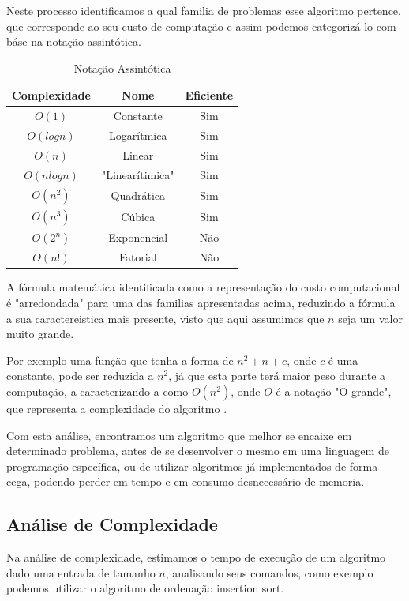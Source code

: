 \documentclass[
	12pt,				%
	openright,			%
	oneside,			%
	a4paper,			%
	english,			%
	brazil				%
	]{abntex2}
\begin{document}
Neste processo identificamos a qual familia de problemas esse algoritmo pertence, que corresponde ao seu custo de
computação \cite{introductionAlgorthms} e assim podemos categorizá-lo com báse na notação assintótica.

\begin{table}[H]
	\centering
	\caption{\label{Notação Assintótica}Notação Assintótica}
	\begin{tabular}{|c|c|c|}
	\hline
		Complexidade & Nome & Eficiente \\ \hline
		$O(1)$ & Constante & Sim \\ \hline
		$O(log n)$ & Logarítmica & Sim \\ \hline
		$O(n)$ & Linear & Sim \\ \hline
		$O(n log n)$ & "Linearítimica" & Sim \\ \hline
		$O(n^2)$ & Quadrática & Sim \\ \hline
		$O(n^3)$ & Cúbica & Sim \\ \hline
		$O(2^n)$ & Exponencial & Não \\ \hline
		$O(n!)$ & Fatorial & Não \\ \hline
	\end{tabular}
\end{table}

A fórmula matemática identificada como a representação do custo computacional é "arredondada" para uma das familias
apresentadas acima, reduzindo a fórmula a sua caractereistica mais presente, visto que aqui assumimos que $n$ seja
um valor muito grande. 

Por exemplo uma função que tenha a forma de $n^2 + n + c$, onde $c$ é uma constante, pode ser reduzida a $n^2$, 
já que esta parte terá maior peso durante a computação, a caracterizando-a como $O(n^2)$, onde $O$ é a notação 
"O grande", que representa a complexidade do algoritmo \cite{introductionAlgorthms}.

Com esta análise, encontramos um algoritmo que melhor se encaixe em determinado problema, antes de se
desenvolver o mesmo em uma linguagem de programação específica, ou de utilizar algoritmos já implementados de forma
cega, podendo perder em tempo e em consumo desnecessário de memoria.

\subsection{Análise de Complexidade}

Na análise de complexidade, estimamos o tempo de execução de um algoritmo dado uma entrada de tamanho $n$, analisando 
seus comandos, como exemplo podemos utilizar o algoritmo de ordenação insertion sort. 
\end{document}
